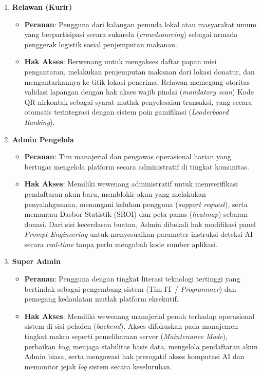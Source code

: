 \begin{enumerate}
    \item \textbf{Relawan (Kurir)}
    \begin{itemize}
        \item \textbf{Peranan}: Pengguna dari kalangan pemuda lokal atau masyarakat umum yang berpartisipasi secara sukarela (\textit{crowdsourcing}) sebagai armada penggerak logistik sosial penjemputan makanan.
        \item \textbf{Hak Akses}: Berwenang untuk mengakses daftar papan misi pengantaran, melakukan penjemputan makanan dari lokasi donatur, dan mengantarkannya ke titik lokasi penerima. Relawan memegang otoritas validasi lapangan dengan hak akses wajib pindai (\textit{mandatory scan}) Kode QR nirkontak sebagai syarat mutlak penyelesaian transaksi, yang secara otomatis terintegrasi dengan sistem poin gamifikasi (\textit{Leaderboard Ranking}).
    \end{itemize}

    \item \textbf{Admin Pengelola}
    \begin{itemize}
        \item \textbf{Peranan}: Tim manajerial dan pengawas operasional harian yang bertugas mengelola platform secara administratif di tingkat komunitas.
        \item \textbf{Hak Akses}: Memiliki wewenang administratif untuk memverifikasi pendaftaran akun baru, memblokir akun yang melakukan penyalahgunaan, menangani keluhan pengguna (\textit{support request}), serta memantau Dasbor Statistik (SROI) dan peta panas (\textit{heatmap}) sebaran donasi. Dari sisi kecerdasan buatan, Admin dibekali hak modifikasi panel \textit{Prompt Engineering} untuk menyesuaikan parameter instruksi deteksi AI secara \textit{real-time} tanpa perlu mengubah kode sumber aplikasi.
    \end{itemize}

    \item \textbf{Super Admin}
    \begin{itemize}
        \item \textbf{Peranan}: Pengguna dengan tingkat literasi teknologi tertinggi yang bertindak sebagai pengembang sistem (Tim IT / \textit{Programmer}) dan pemegang kedaulatan mutlak platform eksekutif.
        \item \textbf{Hak Akses}: Memiliki wewenang manajerial penuh terhadap operasional sistem di sisi peladen (\textit{backend}). Akses difokuskan pada manajemen tingkat makro seperti pemeliharaan server (\textit{Maintenance Mode}), perbaikan \textit{bug}, menjaga stabilitas basis data, mengelola pendaftaran akun Admin biasa, serta mengawasi hak prerogatif akses komputasi AI dan memonitor jejak \textit{log} sistem secara keseluruhan.
    \end{itemize}
\end{enumerate}

